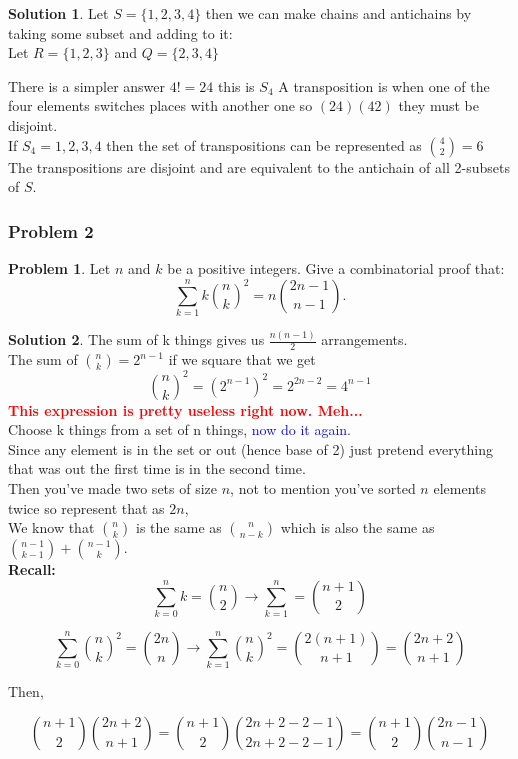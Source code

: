 \documentclass[10pt,a4paper,titlepage,twoside,draft]{article}
\theoremstyle{plain}
\theoremstyle{definition}
\newtheorem*{prob}{Problem}
\newtheorem*{sol}{Solution}
\theoremstyle{remark}
\begin{document}
\medskip

\begin{sol}
Let $S = \{ 1,2,3,4\} $ then we can make chains and antichains by taking some subset and adding to it: \\

Let $R = \{1,2,3\}$  and $Q = \{2,3,4\}$ 

There is a simpler answer $4! =24$ this is $S_{4}$ 
A transposition is when one of the four elements switches places with another one so $(24)(42)$ they must be disjoint.  \\
If $S_{4} = {1,2,3,4}$ then the set of transpositions can be represented as $\binom{4}{2} =6$ \\
The transpositions are disjoint and are equivalent to the antichain of all 2-subsets of $S$.
\end{sol}

\subsubsection{Problem 2}
\begin{prob}
Let $n$ and $k$ be a positive integers. Give a combinatorial proof that:
\[  \sum_{k=1}^nk\binom{n}{k}^2 = n \binom{2n-1}{n-1}.\]
\end{prob}

\medskip

\begin{sol}
The sum of k things gives us $\frac{n(n-1)}{2}$ arrangements. \\

The sum of $\binom{n}{k} = 2^{n-1}$ if we square that we get \[\binom{n}{k}^{2} = (2^{n-1})^{2} = 2^{2n-2} = 4^{n-1}\] \textbf{\textcolor{red}{This expression is pretty useless right now. Meh...}} \\

Choose k things from a set of n things, \textcolor{blue}{now do it again}. \\

Since any element is in the set or out (hence base of 2) just pretend everything that was out the first time is in the second time. \\
Then you've made two sets of size $n$, not to mention you’ve sorted $n$ elements twice so represent that as $2n$, \\
 
We know that $\binom{n}{k}$ is the same as $\binom{n}{n-k}$ which is also the same as $\binom{n-1}{k-1} + \binom{n-1}{k}$. \\

\textbf{Recall:} \\

\[ \sum_{k=0}^{n} k = \binom{n}{2} \rightarrow \sum_{k=1}^{n} = \binom{n+1}{2} \]

\[ \sum_{k=0}^{n} \binom{n}{k}^{2} = \binom{2n}{n} \rightarrow \sum_{k=1}^{n}\binom{n}{k}^{2} = \binom{2(n+1)}{n+1} = \binom{2n+2}{n+1}\]

Then,

\[ \binom{n+1}{2} \binom{2n+2}{n+1} = \binom{n+1}{2} \binom{2n+2 -2 -1}{2n+2 - 2-1} = \binom{n+1}{2} \binom{2n-1}{n-1} \]
\end{sol}
\end{document}
